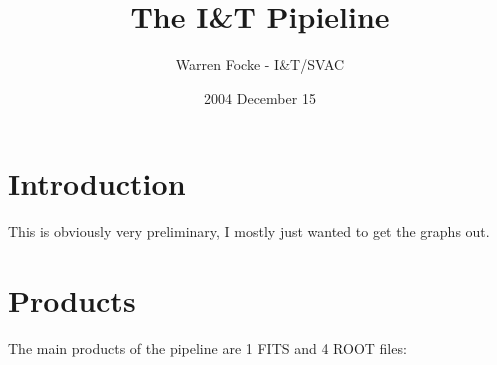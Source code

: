 \documentclass{article}
\begin{document}
\title{The I\&T Pipieline}
\author{Warren Focke - I\&T/SVAC}
\date{2004 December 15}
\maketitle

\def\figref#1{Figure~\ref{#1}}
\def\secref#1{Section~\ref{#1}}

\section{Introduction}
\label{intro-sec}

This is obviously very preliminary, I mostly just wanted to get the graphs
out.

\section{Products}
\label{prod-sec}

The main products of the pipeline are 1 FITS and 4 ROOT files:
\end{document}
